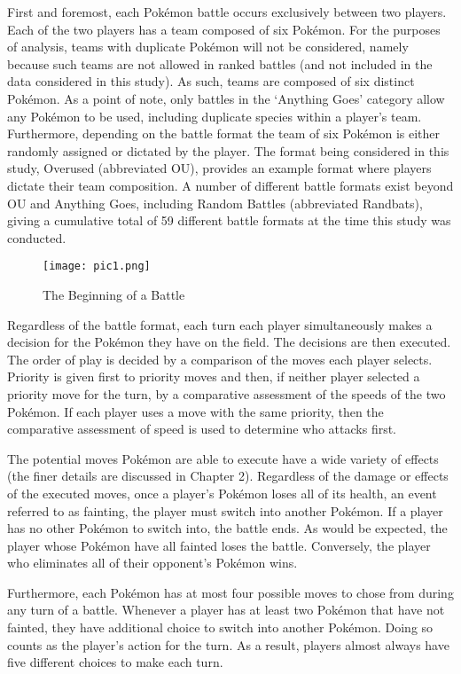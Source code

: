 \documentclass[12pt,twoside]{reedthesis}
\begin{document}
  First and foremost, each Pokémon battle occurs exclusively between two
  players. Each of the two players has a team composed of six Pokémon. For
  the purposes of analysis, teams with duplicate Pokémon will not be
  considered, namely because such teams are not allowed in ranked battles
  (and not included in the data considered in this study). As such, teams
  are composed of six distinct Pokémon. As a point of note, only battles
  in the `Anything Goes' category allow any Pokémon to be used, including
  duplicate species within a player's team. Furthermore, depending on the
  battle format the team of six Pokémon is either randomly assigned or
  dictated by the player. The format being considered in this study,
  Overused (abbreviated OU), provides an example format where players
  dictate their team composition. A number of different battle formats
  exist beyond OU and Anything Goes, including Random Battles (abbreviated
  Randbats), giving a cumulative total of 59 different battle formats at
  the time this study was conducted.
  
  \begin{figure}[htbp]
  \centering
  \texttt{[image: pic1.png]}
  \caption{The Beginning of a Battle}
  \end{figure}
  
  Regardless of the battle format, each turn each player simultaneously
  makes a decision for the Pokémon they have on the field. The decisions
  are then executed. The order of play is decided by a comparison of the
  moves each player selects. Priority is given first to priority moves and
  then, if neither player selected a priority move for the turn, by a
  comparative assessment of the speeds of the two Pokémon. If each player
  uses a move with the same priority, then the comparative assessment of
  speed is used to determine who attacks first.
  
  The potential moves Pokémon are able to execute have a wide variety of
  effects (the finer details are discussed in Chapter 2). Regardless of
  the damage or effects of the executed moves, once a player's Pokémon
  loses all of its health, an event referred to as fainting, the player
  must switch into another Pokémon. If a player has no other Pokémon to
  switch into, the battle ends. As would be expected, the player whose
  Pokémon have all fainted loses the battle. Conversely, the player who
  eliminates all of their opponent's Pokémon wins.
  
  Furthermore, each Pokémon has at most four possible moves to chose from
  during any turn of a battle. Whenever a player has at least two Pokémon
  that have not fainted, they have additional choice to switch into
  another Pokémon. Doing so counts as the player's action for the turn. As
  a result, players almost always have five different choices to make each
  turn.
  
\end{document}
